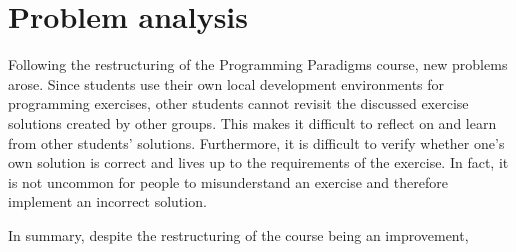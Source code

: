\section{Problem analysis} \label{sec:problem analysis}






Following the restructuring of the Programming Paradigms course, new problems arose.
Since students use their own local development environments for programming exercises, other students cannot revisit the discussed exercise solutions created by other groups. 
This makes it difficult to reflect on and learn from other students' solutions.
Furthermore, it is difficult to verify whether one's own solution is correct and lives up to the requirements of the exercise.
In fact, it is not uncommon for people to misunderstand an exercise and therefore implement an incorrect solution.

In summary, despite the restructuring of the course being an improvement,




